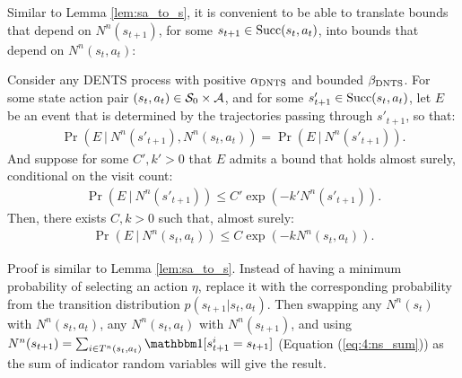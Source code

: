     \proofsep




    

    Similar to Lemma \ref{lem:sa_to_s}, it is convenient to be able to translate bounds that depend on $N^n(s_{t+1})$, for some $s_{t+1}\in{\textnormal{Succ}(s_t,a_t)}$, into bounds that depend on $N^n(s_t,a_t)$:
    \begin{lemma} \label{lem:s_to_sa}
        Consider any DENTS process with positive ${\alpha_{{\textnormal{DNTS}}}}$ and bounded ${\beta_{{\textnormal{DNTS}}}}$. For some state action pair $(s_t,a_t)\in\mathcal{S}_0\times\mathcal{A}$, and for some $s'_{t+1}\in{\textnormal{Succ}(s_t,a_t)}$, let $E$ be an event that is determined by the trajectories passing through $s'_{t+1}$, so that:
        \begin{align}
            \Pr\left(E\ \big|\ N^n(s'_{t+1}), N^n(s_t,a_t)\right) = \Pr\left(E\ \big|\ N^n(s'_{t+1})\right).
                \label{eq:s_to_sa_cond_indep}
        \end{align}
        And suppose for some $C',k'>0$ that $E$ admits a bound that holds almost surely, conditional on the visit count:
        \begin{align}
            \Pr\left(E\ \big|\ N^n(s'_{t+1})\right) \leq C'\exp(-k'N^n(s'_{t+1})).
        \end{align}
        Then, there exists $C,k>0$ such that, almost surely:
        \begin{align}
            \Pr\left(E\ \big|\ N^n(s_t,a_t)\right) \leq C\exp(-k N^n(s_t,a_t)).
        \end{align}
    \end{lemma}
    \begin{proofoutline}
        Proof is similar to Lemma \ref{lem:sa_to_s}. Instead of having a minimum probability of selecting an action $\eta$, replace it with the corresponding probability from the transition distribution $p(s_{t+1}|s_t,a_t)$. Then swapping any $N^n(s_t)$ with $N^n(s_t,a_t)$, any $N^n(s_t,a_t)$ with $N^n(s_{t+1})$, and using $N^n(s_{t+1}) = \sum_{i\in T^n(s_t,a_t)} \one[s^i_{t+1} = s_{t+1}]$ (Equation (\ref{eq:4:ns_sum})) as the sum of indicator random variables will give the result.
    \end{proofoutline}

    \proofsep



